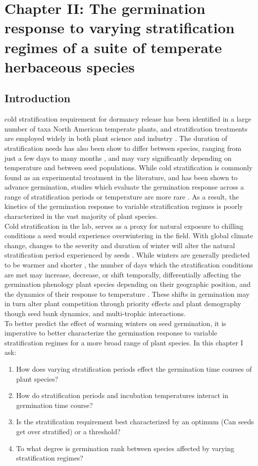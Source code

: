 \documentclass{article}\usepackage[]{graphicx}\usepackage[]{color}
\begin{document}
\section*{Chapter II: The germination response to varying stratification regimes of a suite of temperate herbaceous species}
\subsection*{Introduction}
\indent\indentThe cold stratification requirement for dormancy release has been identified in a large number of taxa North American temperate plants, and stratification treatments are employed widely in both plant science and industry \citep{Hartmann_2011}. The duration of stratification needs has also been show to differ between species, ranging from just a few days to many months \citep{}, and may vary significantly depending on temperature \citep{Steadman2004} and between seed populations. While cold stratification is commonly found as an experimental treatment in the literature, and has been shown to advance germination, studies which evaluate the germination response across a range of stratification periods or temperature are more rare \citep{Batlla2009}. As a result, the kinetics of the germination response to variable stratification regimes is poorly characterized in the vast majority of plant species.\\
\indent Cold stratification in the lab, serves as a proxy for natural exposure to chilling conditions a seed would experience overwintering in the field. With global climate change, changes to the severity and duration of winter will alter the natural stratification period experienced by seeds \citep{Walck2011}. While winters are generally predicted to be warmer and shorter \citep{IPCC}, the number of days which the stratification conditions are met may increase, decrease, or shift temporally, differentially affecting the germination phenology plant species depending on their geographic position, and the dynamics of their response to temperature \citep{Walck2011}. These shifts in germination may in turn alter plant competition through priority effects \citep{Gioria2018} and plant demography though seed bank dynamics, and multi-trophic interactions.\\
\indent To better predict the effect of warming winters on seed germination, it is imperative to better characterize the germination response to variable stratification regimes for a more broad range of plant species. In this chapter I ask:
\begin{enumerate}
\item How does varying stratification periods effect the germination time courses of plant species?
\item How do stratification periods and incubation temperatures interact in germination time course?
\item Is the stratification requirement best characterized by an optimum (Can seeds get over stratified) or a threshold?
\item To what degree is germination rank between species affected by varying stratification regimes?
\end{enumerate}
\end{document}
